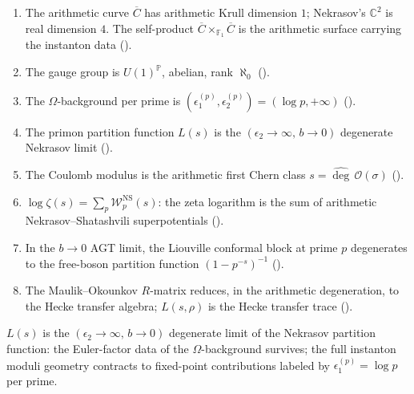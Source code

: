 \begin{enumerate}
\item The arithmetic curve \(\overline{C}\) has arithmetic Krull dimension
\(1\); Nekrasov's \(\mathbb{C}^{2}\) is real dimension \(4\). The self-product
\(\overline{C}\times_{\mathbb{F}_{1}}\overline{C}\) is the arithmetic surface
carrying the instanton data ().
\item The gauge group is \(U(1)^{\mathbb{P}}\), abelian, rank \(\aleph_{0}\)
().
\item The \(\Omega\)-background per prime is
\((\epsilon_{1}^{(p)},\epsilon_{2}^{(p)})=(\log p,+\infty)\)
().
\item The primon partition function \(L(s)\) is the
\((\epsilon_{2}\to\infty,\,b\to 0)\) degenerate Nekrasov limit
().
\item The Coulomb modulus is the arithmetic first Chern class
\(s=\widehat{\deg}\,\mathcal{O}(\sigma)\)
().
\item \(\log\zeta(s)=\sum_{p}\mathcal{W}^{\mathrm{NS}}_{p}(s)\):
the zeta logarithm is the sum of arithmetic Nekrasov--Shatashvili
superpotentials ().
\item In the \(b\to 0\) AGT limit, the Liouville conformal block at
prime \(p\) degenerates to the free-boson partition function
\((1-p^{-s})^{-1}\) ().
\item The Maulik--Okounkov \(R\)-matrix reduces, in the arithmetic
degeneration, to the Hecke transfer algebra; \(L(s,\rho)\) is the
Hecke transfer trace ().
\end{enumerate}

\(L(s)\) is the \((\epsilon_{2}\to\infty,\,b\to 0)\) degenerate limit of the
Nekrasov partition function: the Euler-factor data of the \(\Omega\)-background
survives; the full instanton moduli geometry contracts to fixed-point
contributions labeled by \(\epsilon_{1}^{(p)}=\log p\) per prime.
